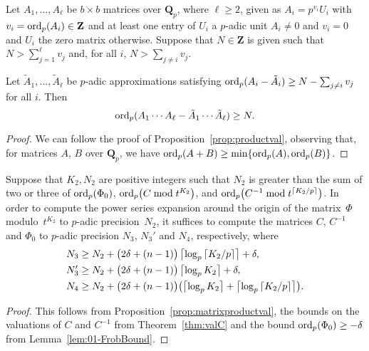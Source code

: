 \begin{prop} \label{prop:matrixproductval}
Let $A_1, \dotsc, A_{\ell}$ be $b \times b$ matrices over $\mathbf{Q}_p$, 
where $\ell \geq 2$, given as $A_i = p^{v_i} U_i$ with 
$v_i = \operatorname{ord}_p(A_i) \in \mathbf{Z}$ and at least one entry of $U_i$ a 
$p$-adic unit $A_i \neq 0$ and $v_i = 0$ and $U_i$ the zero matrix 
otherwise.  Suppose that $N \in \mathbf{Z}$ is given such that 
$N > \sum_{j=1}^{\ell} v_j$ and, for all $i$, $N > \sum_{j \neq i} v_j$.

Let $\tilde{A}_1, \dotsc, \tilde{A}_{\ell}$ be $p$-adic approximations 
satisfying $\operatorname{ord}_p(A_i - \tilde{A}_i) \geq N - \sum_{j \neq i} v_j$ 
for all $i$.  Then 
\begin{equation*}
\operatorname{ord}_p(A_1 \dotsm A_{\ell} - \tilde{A}_1 \dotsm \tilde{A}_{\ell}) \geq N.
\end{equation*}
\end{prop}

\begin{proof}
We can follow the proof of Proposition~\ref{prop:productval}, 
observing that, for matrices $A$, $B$ over $\mathbf{Q}_p$, 
we have $\operatorname{ord}_p(A + B) \geq \min \{\operatorname{ord}_p(A), \operatorname{ord}_p(B)\}$.
\end{proof}

\begin{cor}
Suppose that $K_2, N_2$ are positive integers such that $N_2$ is greater than 
the sum of two or three of $\operatorname{ord}_p(\Phi_0)$, $\operatorname{ord}_p\bigl(C \bmod t^{K_2}\bigr)$, 
and $\operatorname{ord}_p\bigl(C^{-1} \bmod{t^{\left\lceil K_2/p\right\rceil}}\bigr)$.
In order to compute the power series expansion around the origin 
of the matrix~$\Phi$ modulo~$t^{K_2}$ to $p$-adic precision~$N_2$, it 
suffices to compute the matrices $C$, $C^{-1}$ and $\Phi_0$ to 
$p$-adic precision $N_3$, $N_3'$ and $N_4$, respectively, where 
\begin{align*}
N_3  & \geq N_2 + \bigl(2\delta+(n-1)\bigr) \left\lceil\log_p \left\lceil K_2/p\right\rceil\right\rceil + \delta, \\
N_3' & \geq N_2 + \bigl(2\delta+(n-1)\bigr) \left\lceil\log_p K_2\right\rceil + \delta, \\
N_4  & \geq N_2 + \bigl(2\delta+(n-1)\bigr) \bigl(\left\lceil\log_p K_2\right\rceil + \left\lceil\log_p \left\lceil K_2/p\right\rceil\right\rceil\bigr).
\end{align*}
\end{cor}

\begin{proof}
This follows from Proposition~\ref{prop:matrixproductval}, the bounds 
on the valuations of $C$ and $C^{-1}$ from Theorem~\ref{thm:valC} and 
the bound $\operatorname{ord}_p(\Phi_0) \geq - \delta$ from Lemma~\ref{lem:01-FrobBound}.
\end{proof}

